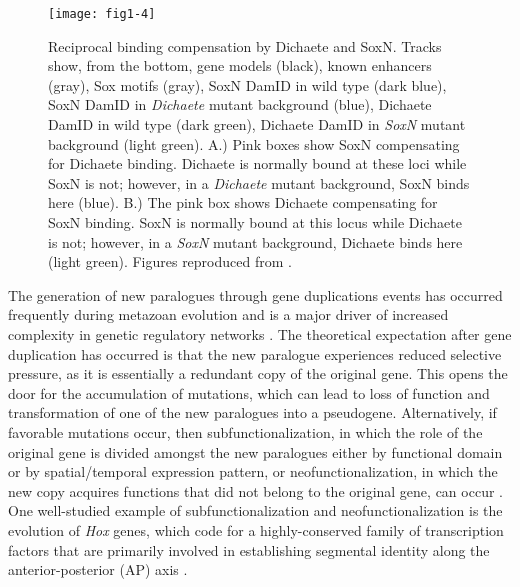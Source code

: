 \begin{figure}
\centering
\texttt{[image: fig1-4]}
\caption{Reciprocal binding compensation by Dichaete and SoxN. Tracks show, from the bottom, gene models (black), known enhancers (gray), Sox motifs (gray), SoxN DamID in wild type (dark blue), SoxN DamID in \emph{Dichaete} mutant background (blue), Dichaete DamID in wild type (dark green), Dichaete DamID in \emph{SoxN} mutant background (light green). A.) Pink boxes show SoxN compensating for Dichaete binding. Dichaete is normally bound at these loci while SoxN is not; however, in a \emph{Dichaete} mutant background, SoxN binds here (blue). B.) The pink box shows Dichaete compensating for SoxN binding. SoxN is normally bound at this locus while Dichaete is not; however, in a \emph{SoxN} mutant background, Dichaete binds here (light green). Figures reproduced from \citet{ferrero_soxneuro_2014}.}
\label{Figure 1.4}
\end{figure}

The generation of new paralogues through gene duplications events has occurred frequently during metazoan evolution and is a major driver of increased complexity in genetic regulatory networks \citep{larroux_genesis_2008}. The theoretical expectation after gene duplication has occurred is that the new paralogue experiences reduced selective pressure, as it is essentially a redundant copy of the original gene. This opens the door for the accumulation of mutations, which can lead to loss of function and transformation of one of the new paralogues into a pseudogene. Alternatively, if favorable mutations occur, then subfunctionalization, in which the role of the original gene is divided amongst the new paralogues either by functional domain or by spatial/temporal expression pattern, or neofunctionalization, in which the new copy acquires functions that did not belong to the original gene, can occur \citep{force_preservation_1999,lynch_evolutionary_2000}. One well-studied example of subfunctionalization and neofunctionalization is the evolution of \emph{Hox} genes, which code for a highly-conserved family of transcription factors that are primarily involved in establishing segmental identity along the anterior-posterior (AP) axis \citep{kappen_evolution_1993}.\\ 


